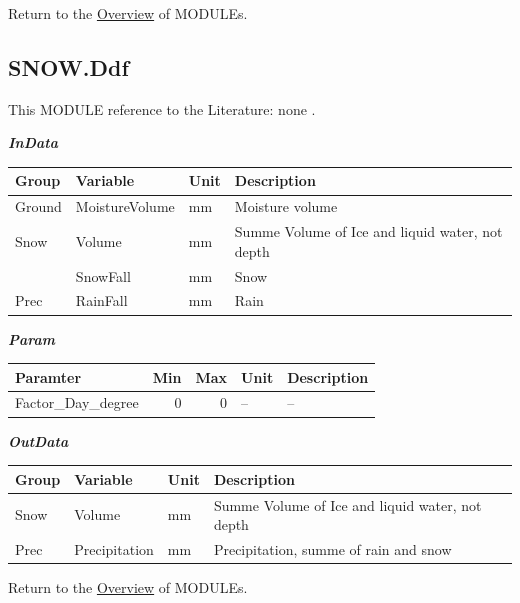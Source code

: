\documentclass[
]{book}
\begin{document}
Return to the \protect\hyperlink{module}{Overview} of MODULEs.

\hypertarget{SNOW.Ddf}{%
\subsection{SNOW.Ddf}\label{SNOW.Ddf}}

This MODULE reference to the Literature: none \citep{none}.

\textbf{\emph{InData}}

\begin{table}[!h]
\centering
\begin{tabular}{l|l|l|l}
\hline
Group & Variable & Unit & Description\\
\hline
Ground & MoistureVolume & mm & Moisture volume\\
\cline{1-4}
Snow & Volume & mm & Summe Volume of Ice and liquid water, not depth\\
\cline{1-4}
 & SnowFall & mm & Snow\\
\cline{2-4}
\multirow{-2}{*}{\raggedright\arraybackslash Prec} & RainFall & mm & Rain\\
\hline
\end{tabular}
\end{table}

\textbf{\emph{Param}}

\begin{table}[!h]
\centering
\begin{tabular}{l|r|r|l|l}
\hline
Paramter & Min & Max & Unit & Description\\
\hline
Factor\_Day\_degree & 0 & 0 & -- & --\\
\hline
\end{tabular}
\end{table}

\textbf{\emph{OutData}}

\begin{table}[!h]
\centering
\begin{tabular}{l|l|l|l}
\hline
Group & Variable & Unit & Description\\
\hline
Snow & Volume & mm & Summe Volume of Ice and liquid water, not depth\\
\cline{1-4}
Prec & Precipitation & mm & Precipitation, summe of rain and snow\\
\hline
\end{tabular}
\end{table}

Return to the \protect\hyperlink{module}{Overview} of MODULEs.
\end{document}
